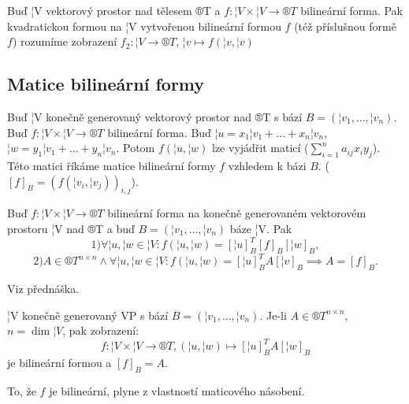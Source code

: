 \documentclass[12pt]{article}                   %
\begin{document}
    \begin{definice}
        Buď ¦V vektorový prostor nad tělesem ®T a $f: ¦V \times ¦V \rightarrow ®T$ bilineární forma. Pak kvadratickou formou na ¦V vytvořenou bilineární formou $f$ (též příslušnou formě $f$) rozumíme zobrazení $f_2: ¦V \rightarrow ®T$, $¦v \mapsto f(¦v, ¦v)$
    \end{definice}

    \subsection{Matice bilineární formy}
        \begin{definice}
            Buď ¦V konečně generovaný vektorový prostor nad ®T s bází $B = (¦v_1, …, ¦v_n)$. Buď $f: ¦V \times ¦V \rightarrow ®T$ bilineární forma. Buď $¦u = x_1¦v_1 + … + x_n¦v_n$, $¦w = y_1¦v_1 + … +y_n¦v_n$. Potom $f(¦u, ¦w)$ lze vyjádřit maticí ($\sum_{i=1}^na_{ij}x_iy_j$). Této matici říkáme matice bilineární formy $f$ vzhledem k bázi $B$. ($[f]_B = (f(¦v_i, ¦v_j))_{i, j}$).
        \end{definice}


        \begin{tvrzeni}
            Buď $f: ¦V \times ¦V \rightarrow ®T$ bilineární forma na konečně generovaném vektorovém prostoru ¦V nad ®T a buď $B = (¦v_1, …, ¦v_n)$ báze ¦V. Pak
            $$ 1) \forall ¦u, ¦w \in ¦V: f(¦u, ¦w) = [¦u]^T_B [f]_B [¦w]_B, $$
            $$ 2) A \in ®T^{n \times n} \land \forall ¦u, ¦w \in ¦V: f(¦u, ¦w) = [¦u]^T_B A [¦v]_B \implies A = [f]_B. $$ 

            \begin{dukazin}
                Viz přednáška.
            \end{dukazin}
        \end{tvrzeni}

        \begin{tvrzeni}
            ¦V konečně generovaný VP s bází $B = (¦v_1, …, ¦v_n)$. Je-li $A \in ®T^{n \times n}$, $n = \dim ¦V$, pak zobrazení:
            $$ f: ¦V \times ¦V \rightarrow ®T, (¦u, ¦w) \mapsto [¦u]_B^T A [¦w]_B $$
            je bilineární formou a $[f]_B = A$.

            \begin{dukazin}
                To, že $f$ je bilineární, plyne z vlastností maticového násobení.
            \end{dukazin}
        \end{tvrzeni}
\end{document}
